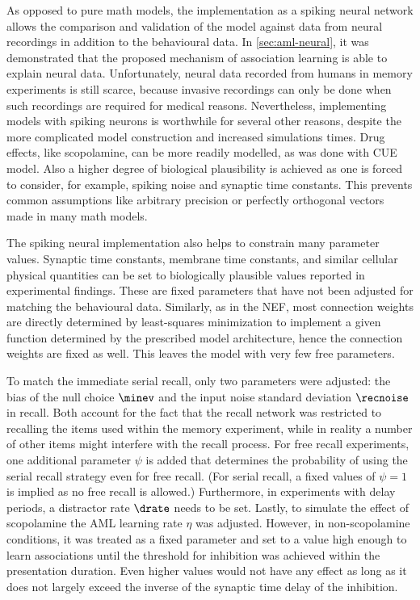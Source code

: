 As opposed to pure math models, the implementation as a spiking neural network allows the comparison and validation of the model against data from neural recordings in addition to the behavioural data.
In \cref{sec:aml-neural}, it was demonstrated that the proposed mechanism of association learning is able to explain neural data.
Unfortunately, neural data recorded from humans in memory experiments is still scarce, because invasive recordings can only be done when such recordings are required for medical reasons.
Nevertheless, implementing models with spiking neurons is worthwhile for several other reasons, despite the more complicated model construction and increased simulations times.
Drug effects, like scopolamine, can be more readily modelled, as was done with CUE model.
Also a higher degree of biological plausibility is achieved as one is forced to consider, for example, spiking noise and synaptic time constants.
This prevents common assumptions like arbitrary precision or perfectly orthogonal vectors made in many math models.

The spiking neural implementation also helps to constrain many parameter values.
Synaptic time constants, membrane time constants, and similar cellular physical quantities can be set to biologically plausible values reported in experimental findings.
These are fixed parameters that have not been adjusted for matching the behavioural data.
Similarly, as in the NEF, most connection weights are directly determined by least-squares minimization to implement a given function determined by the prescribed model architecture, hence the connection weights are fixed as well.
This leaves the model with very few free parameters.

To match the immediate serial recall, only two parameters were adjusted: the bias of the null choice $\minev$ and the input noise standard deviation $\recnoise$ in recall.
Both account for the fact that the recall network was restricted to recalling the items used within the memory experiment, while in reality a number of other items might interfere with the recall process.
For free recall experiments, one additional parameter $\psi$ is added that determines the probability of using the serial recall strategy even for free recall.
(For serial recall, a fixed values of $\psi = 1$ is implied as no free recall is allowed.)
Furthermore, in experiments with delay periods, a distractor rate $\drate$ needs to be set.
Lastly, to simulate the effect of scopolamine the AML learning rate $\eta$ was adjusted.
However, in non-scopolamine conditions, it was treated as a fixed parameter and set to a value high enough to learn associations until the threshold for inhibition was achieved within the presentation duration.
Even higher values would not have any effect as long as it does not largely exceed the inverse of the synaptic time delay of the inhibition.

